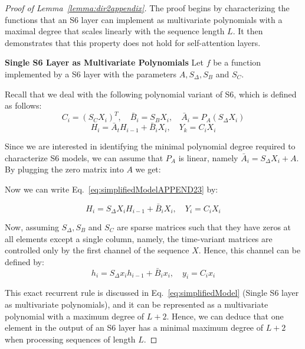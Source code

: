 \begin{proof}[Proof of Lemma~\ref{lemma:dir2appendix}]\quad
The proof begins by characterizing the functions that an S6 layer can implement as multivariate polynomials with a maximal degree that scales linearly with the sequence length $L$. It then demonstrates that this property does not hold for self-attention layers.

\noindent\textbf{Single S6 Layer as Multivariate Polynomials\quad} 
Let $f$ be a function implemented by a S6 layer with the parameters $A, S_{\Delta}, S_{B}$ and $S_{C}$.

\smallskip
Recall that we deal with the following polynomial variant of S6, which is defined as follows:
\begin{equation}\label{eq:simplifiedModelAPPEND23}
    C_i = ( {S_C}X_i )^T, \quad \bar{B}_i = S_B X_i, \quad \bar{A}_i = P_A ( S_\Delta X_i )
\end{equation}
\begin{equation}\label{eq:simplifiedModelAPPEND234}
     H_{i} =  \bar{A}_t H_{i-1} + \bar{B}_i X_i, \quad Y_k = C_i X_i
\end{equation}

Since we are interested in identifying the minimal polynomial degree required to characterize S6 models, we can assume that $P_A$ is linear, namely $\bar{A}_i = S_\Delta X_i + A $. By plugging the zero matrix into $A$ we get:

Now we can write Eq.~\ref{eq:simplifiedModelAPPEND23} by:

\begin{equation}\label{eq:simplifiedModelAPPEND25}
     H_{i} =  S_\Delta X_i H_{i-1} + \bar{B}_i X_i, \quad Y_i = C_i X_i
\end{equation}


Now, assuming $S_{\Delta}, S_{B}$ and $S_{C}$ are sparse matrices such that they have zeros at all elements except a single column, namely, the time-variant matrices are controlled only by the first channel of the sequence $X$. Hence, this channel can be defined by:
\begin{equation}\label{eq:simplifiedModelAPPEND6}
     h_{i} =  S_\Delta x_i h_{i-1} + \bar{B}_i x_i, \quad y_i = C_i x_i
\end{equation}

This exact recurrent rule is discussed in Eq.~\ref{eq:simplifiedModel} (Single S6 layer as multivariate polynomials), and it can be represented as a multivariate polynomial with a maximum degree of $L+2$. Hence, we can deduce that one element in the output of an S6 layer has a minimal maximum degree of $L + 2$ when processing sequences of length $L$. 



\end{proof}
